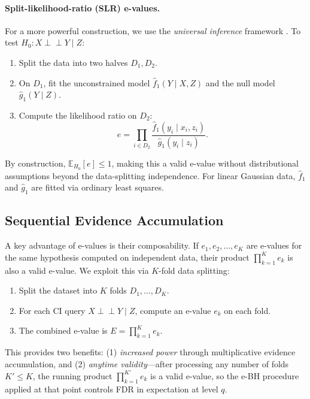 \documentclass[11pt]{article}
\newcommand{\indep}{\perp\!\!\!\perp}
\newcommand{\E}{\mathbb{E}}
\begin{document}
\paragraph{Split-likelihood-ratio (SLR) e-values.}
For a more powerful construction, we use the \emph{universal inference} framework \citep{wasserman2020universal}. To test $H_0: X \indep Y \mid Z$:
\begin{enumerate}
    \item Split the data into two halves $D_1, D_2$.
    \item On $D_1$, fit the unconstrained model $\hat{f}_1(Y \mid X, Z)$ and the null model $\hat{g}_1(Y \mid Z)$.
    \item Compute the likelihood ratio on $D_2$:
    \begin{equation}
    \label{eq:slr}
    e = \prod_{i \in D_2} \frac{\hat{f}_1(y_i \mid x_i, z_i)}{\hat{g}_1(y_i \mid z_i)}.
    \end{equation}
\end{enumerate}
By construction, $\E_{H_0}[e] \leq 1$, making this a valid e-value without distributional assumptions beyond the data-splitting independence. For linear Gaussian data, $\hat{f}_1$ and $\hat{g}_1$ are fitted via ordinary least squares.

\subsection{Sequential Evidence Accumulation}

A key advantage of e-values is their composability. If $e_1, e_2, \ldots, e_K$ are e-values for the same hypothesis computed on independent data, their product $\prod_{k=1}^{K} e_k$ is also a valid e-value. We exploit this via $K$-fold data splitting:
\begin{enumerate}
    \item Split the dataset into $K$ folds $D_1, \ldots, D_K$.
    \item For each CI query $X \indep Y \mid Z$, compute an e-value $e_k$ on each fold.
    \item The combined e-value is $E = \prod_{k=1}^{K} e_k$.
\end{enumerate}

This provides two benefits: (1) \emph{increased power} through multiplicative evidence accumulation, and (2) \emph{anytime validity}---after processing any number of folds $K' \leq K$, the running product $\prod_{k=1}^{K'} e_k$ is a valid e-value, so the e-BH procedure applied at that point controls FDR in expectation at level $q$.
\end{document}
